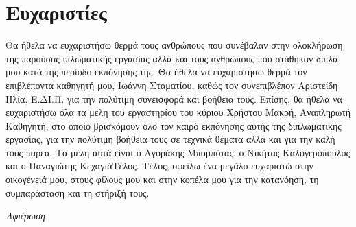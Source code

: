 \chapter*{Ευχαριστίες}

\pagestyle{plain}

Θα ήθελα να ευχαριστήσω θερμά τους ανθρώπους που συνέβαλαν στην ολοκλήρωση
της παρούσας ιπλωματικής εργασίας αλλά και τους ανθρώπους που στάθηκαν δίπλα μου κατά της περίοδο εκπόνησης της. Θα ήθελα να ευχαριστήσω θερμά τον επιβλέποντα καθηγητή μου, Ιωάννη Σταματίου, καθώς τον συνεπιβλέπον Αριστείδη Ηλία, Ε.ΔΙ.Π. για την πολύτιμη συνεισφορά και βοήθεια τους. Επίσης, θα ήθελα να ευχαριστήσω όλα τα μέλη του εργαστηρίου του κύριου Χρήστου Μακρή, Αναπληρωτή Καθηγητή, στο οποίο βρισκόμουν όλο τον καιρό εκπόνησης αυτής της διπλωματικής εργασίας, για την πολύτιμη βοήθεία τους σε τεχνικά θέματα αλλά και για την καλή τους παρέα. Τα μέλη αυτά είναι ο Αγοράκης Μπομπότας, ο Νικήτας Καλογερόπουλος και ο Παναγιώτης ΚεχαγιάΤέλος. Τέλος, οφείλω ένα μεγάλο ευχαριστώ στην οικογένειά μου, στους φίλους μου και στην κοπέλα μου για την κατανόηση, τη συμπαράσταση και τη στήριξή τους.

\null\vfill
\begin{flushright}
    \textit{Αφιέρωση}
\end{flushright}